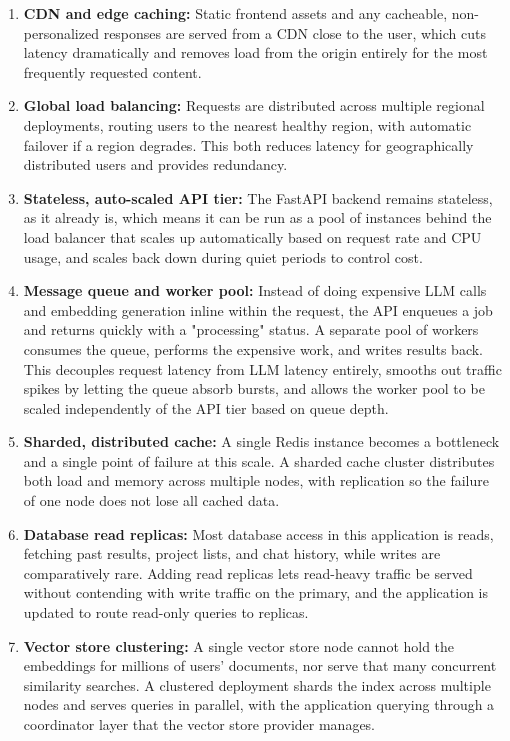 \documentclass[11pt,a4paper]{report}
\begin{document}
\begin{enumerate}[leftmargin=*]
\item \textbf{CDN and edge caching:} Static frontend assets and any cacheable, non-personalized responses are served from a CDN close to the user, which cuts latency dramatically and removes load from the origin entirely for the most frequently requested content.

\item \textbf{Global load balancing:} Requests are distributed across multiple regional deployments, routing users to the nearest healthy region, with automatic failover if a region degrades. This both reduces latency for geographically distributed users and provides redundancy.

\item \textbf{Stateless, auto-scaled API tier:} The FastAPI backend remains stateless, as it already is, which means it can be run as a pool of instances behind the load balancer that scales up automatically based on request rate and CPU usage, and scales back down during quiet periods to control cost.

\item \textbf{Message queue and worker pool:} Instead of doing expensive LLM calls and embedding generation inline within the request, the API enqueues a job and returns quickly with a "processing" status. A separate pool of workers consumes the queue, performs the expensive work, and writes results back. This decouples request latency from LLM latency entirely, smooths out traffic spikes by letting the queue absorb bursts, and allows the worker pool to be scaled independently of the API tier based on queue depth.

\item \textbf{Sharded, distributed cache:} A single Redis instance becomes a bottleneck and a single point of failure at this scale. A sharded cache cluster distributes both load and memory across multiple nodes, with replication so the failure of one node does not lose all cached data.

\item \textbf{Database read replicas:} Most database access in this application is reads, fetching past results, project lists, and chat history, while writes are comparatively rare. Adding read replicas lets read-heavy traffic be served without contending with write traffic on the primary, and the application is updated to route read-only queries to replicas.

\item \textbf{Vector store clustering:} A single vector store node cannot hold the embeddings for millions of users' documents, nor serve that many concurrent similarity searches. A clustered deployment shards the index across multiple nodes and serves queries in parallel, with the application querying through a coordinator layer that the vector store provider manages.


\end{enumerate}
\end{document}
